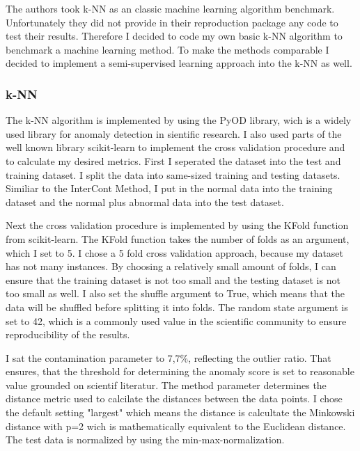 The authors took k-NN as an classic machine learning algorithm benchmark.
Unfortunately they did not provide in their reproduction package any code to test their results.
Therefore I decided to code my own basic k-NN algorithm to benchmark a machine learning method.
To make the methods comparable I decided to implement a semi-supervised learning approach into the k-NN as well.



\subsubsection*{k-NN}
The k-NN algorithm is implemented by using the PyOD library, wich is a widely used library for anomaly detection in sientific research.
I also used parts of the well known library scikit-learn to implement the cross validation procedure and to calculate my desired metrics.
First I seperated the dataset into the test and training dataset.
I split the data into same-sized training and testing datasets.
Similiar to the InterCont Method, I put in the normal data into the training dataset and the normal plus abnormal data into the test dataset.


Next the cross validation procedure is implemented by using the KFold function from scikit-learn.
The KFold function takes the number of folds as an argument, which I set to 5.
I chose a 5 fold cross validation approach, because my dataset has not many instances. 
By choosing a relatively small amount of folds, I can ensure that the training dataset is not too small and the testing dataset is not too small as well.
I also set the shuffle argument to True, which means that the data will be shuffled before splitting it into folds.
The random state argument is set to 42, which is a commonly used value in the scientific community to ensure reproducibility of the results.


I sat the contamination parameter to 7,7\%, reflecting the outlier ratio.
That ensures, that the threshold for determining the anomaly score is set to reasonable value grounded on scientif literatur.
The  method parameter determines the distance metric used to calcilate the distances between the data points.
I chose the default setting "largest" which means the distance is calcultate the Minkowski distance with p=2 wich is mathematically equivalent to the Euclidean distance.
The test data is normalized by using the min-max-normalization.



